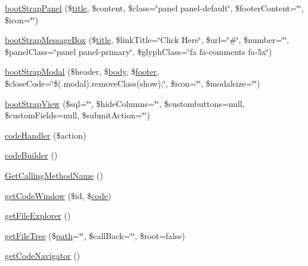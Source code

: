 \begin{DoxyCompactItemize}
\item 
\hyperlink{classCody_a286ac4c282deba8991d57ce83f43a07f}{boot\+Strap\+Panel} (\$\hyperlink{Shape_8php_ad264ad0cabbe965bf7f7c8a5ed6abebb}{title}, \$content, \$class=\char`\"{}panel panel-\/default\char`\"{}, \$footer\+Content=\char`\"{}\char`\"{}, \$icon=\char`\"{}\char`\"{})
\item 
\hyperlink{classCody_a5eaecf702f81ad0cee70cad3a7f9bcfa}{boot\+Strap\+Message\+Box} (\$\hyperlink{Shape_8php_ad264ad0cabbe965bf7f7c8a5ed6abebb}{title}, \$link\+Title=\char`\"{}Click Here\char`\"{}, \$url=\char`\"{}\#\char`\"{}, \$number=\char`\"{}\char`\"{}, \$panel\+Class=\char`\"{}panel panel-\/primary\char`\"{}, \$glyph\+Class=\char`\"{}fa fa-\/comments fa-\/5x\char`\"{})
\item 
\hyperlink{classCody_a60d6b062da92824ee778cd1666e31c23}{boot\+Strap\+Modal} (\$header, \$\hyperlink{Shape_8php_a88c61c5f59a3f950b502f07325de2f87}{body}, \$\hyperlink{Shape_8php_ae5058e5b790e8cea2dd33c1c9bbcbbd4}{footer}, \$close\+Code=\char`\"{}\$(\textquotesingle{}.modal\textquotesingle{}).remove\+Class(\textquotesingle{}show\textquotesingle{});\char`\"{}, \$icon=\char`\"{}\char`\"{}, \$modalsize=\char`\"{}\char`\"{})
\item 
\hyperlink{classCody_a8518bcc95441b4c3e7fbae070c0402fb}{boot\+Strap\+View} (\$sql=\char`\"{}\char`\"{}, \$hide\+Columns=\char`\"{}\char`\"{}, \$custombuttons=null, \$custom\+Fields=null, \$submit\+Action=\char`\"{}\char`\"{})
\item 
\hyperlink{classCody_a9d96d2252b6a5ae82ebeeb6fffcfdb58}{code\+Handler} (\$action)
\item 
\hyperlink{classCody_a993ccef820ff205c9a96511a473ff9f7}{code\+Builder} ()
\item 
\hyperlink{classCody_a2aa1fc0af17ec69cc1a909e6646debb4}{Get\+Calling\+Method\+Name} ()
\item 
\hyperlink{classCody_a4b33bd3c589058703a35914506890293}{get\+Code\+Window} (\$id, \$\hyperlink{Shape_8php_ab09356b52e00cf46f1ee5be7344c9139}{code})
\item 
\hyperlink{classCody_a5737b5a18b58d98dc4a6f8ebc9053d3b}{get\+File\+Explorer} ()
\item 
\hyperlink{classCody_aff64a768f79ea2641d2a1ac1b5a976a5}{get\+File\+Tree} (\$\hyperlink{Shape_8php_a3b05eec13add53df44e232273d718ae4}{path}=\char`\"{}\char`\"{}, \$call\+Back=\char`\"{}\char`\"{}, \$root=false)
\item 
\hyperlink{classCody_aba8685265ba1d7dc8bae6250242a7956}{get\+Code\+Navigator} ()
\item 

\end{DoxyCompactItemize}
